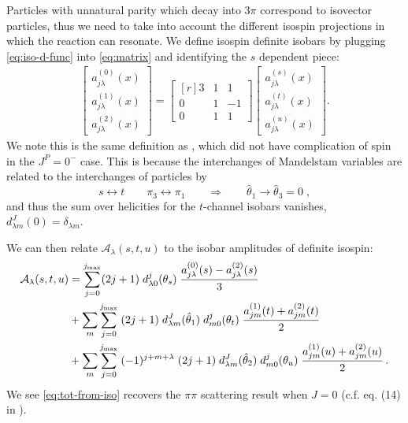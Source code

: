 Particles with unnatural parity which decay into \(3\pi\) correspond to isovector particles, thus we need to take into account the different isospin projections in which the reaction can resonate.
We define isospin definite isobars by plugging \cref{eq:iso-d-func} into \cref{eq:matrix} and identifying the \(s\) dependent piece:
\begin{align}
  \begin{bmatrix}
  a^{(0)}_{j\lambda}(x) \\ a^{(1)}_{j\lambda}(x) \\ a^{(2)}_{j\lambda}(x)
  \end{bmatrix}
=
  \begin{bmatrix*}[r]
    3 & 1 & 1 \\ 	0 & 1 & -1 \\ 0 & 1 & 1
  \end{bmatrix*}
  \begin{bmatrix}
  a^{(s)}_{j\lambda}(x) \\ a^{(t)}_{j\lambda}(x) \\ a^{(u)}_{j\lambda}(x)
  \end{bmatrix}.
\end{align}
We note this is the same definition as \cite{Albaladejo2018}, which did not have complication of spin in the \(J^P = 0^-\) case. This is because the interchanges of Mandelstam variables are related to the interchanges of particles by
  \begin{equation}
    \label{frame-change}
    s\leftrightarrow  t  \qquad \pi_3 \leftrightarrow \pi_1 \qquad \Rightarrow \qquad \hat{\theta}_1 \to \hat{\theta}_3 = 0 \; ,
  \end{equation}
and thus the sum over helicities for the \(t\)-channel isobars vanishes, \(d_{\lambda m}^J(0) = \delta_{\lambda m} \).

We can then relate \(\mathcal{A}_\lambda(s,t,u)\) to the isobar amplitudes of definite isospin:
  \begin{align}
    \label{eq:tot-from-iso}
    \mathcal{A}_\lambda(s,t,u) &= \sum_{j = 0}^{j_\text{max}}
      (2j + 1) \; d_{\lambda 0}^j(\theta_s) \;
      \frac{
     a_{j \lambda}^{(0)}(s) - a_{j \lambda}^{(2)}(s)
     }{
     3
     } \nonumber \\
     &+ \sum_m \sum_{j=0}^{j_\text{max}} \; (2j+1)
     \; d^{J}_{\lambda m}(\hat{\theta}_1) \; d_{m0}^j(\theta_t) \;
     \frac{
     a^{(1)}_{j m}(t) + a^{(2)}_{j m}(t)
     }{
     2
     } \\
     &+ \sum_m \sum_{j=0}^{j_\text{max}} \; (-1)^{j + m + \lambda} \; (2j+1)
     \; d^{J}_{\lambda m}(\hat{\theta}_2) \; d_{m0}^j(\theta_u) \;
     \frac{
     a^{(1)}_{jm}(u) + a^{(2)}_{j m}(u)
     }{
     2
     } \, . \nonumber
  \end{align}
We see \cref{eq:tot-from-iso} recovers the \(\pi\pi\) scattering result when \(J = 0\) (c.f. eq. (14) in \cite{Albaladejo2018}).

